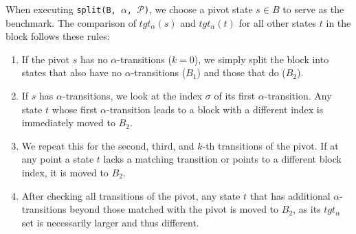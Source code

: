 When executing \texttt{split(B, $\alpha$, $\mathcal{P}$)}, we choose a pivot state $s \in B$ to serve as the benchmark. The comparison of $tgt_{\alpha}(s)$ and $tgt_{\alpha}(t)$ for all other states $t$ in the block follows these rules:  
\begin{enumerate}
    \item If the pivot $s$ has no $\alpha$-transitions ($k=0$), we simply split the block into states that also have no $\alpha$-transitions ($B_1$) and those that do ($B_2$).  
    \item If $s$ has $\alpha$-transitions, we look at the index $\sigma$ of its first $\alpha$-transition. Any state $t$ whose first $\alpha$-transition leads to a block with a different index is immediately moved to $B_2$.  
    \item We repeat this for the second, third, and $k$-th transitions of the pivot. If at any point a state $t$ lacks a matching transition or points to a different block index, it is moved to $B_2$.  
    \item After checking all transitions of the pivot, any state $t$ that has additional $\alpha$-transitions beyond those matched with the pivot is moved to $B_2$, as its $tgt_{\alpha}$ set is necessarily larger and thus different.
\end{enumerate}

